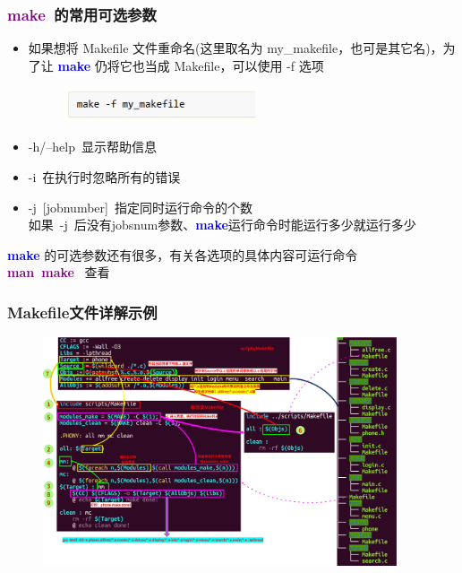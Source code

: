 \frame
{
	\frametitle{\textcolor{purple}{\textbf{make}}~的常用可选参数}
	\begin{itemize}
\item 如果想将 \textrm{Makefile} 文件重命名(这里取名为 \textrm{my\_makefile}，也可是其它名)，为了让 \textcolor{blue}{\textbf{make}} 仍将它也当成 \textrm{Makefile}，可以使用 \textrm{-f} 选项
\begin{figure}[h!]
	\vskip -4pt
\centering
\includegraphics[height=0.4in,clip]{Figures/Make_Makefile_0.png}
\label{Fig:Make_Makefile_0}
\end{figure}
\item \textrm{-h/--help}~显示帮助信息
\item \textrm{-i}~在执行时忽略所有的错误
\item \textrm{-j~[jobnumber]}~指定同时运行命令的个数\\
\vskip 3pt
	如果~\textrm{-j}~后没有\textrm{jobsnum}参数、\textcolor{blue}{\textbf{make}}运行命令时能运行多少就运行多少
	\end{itemize}
\vskip 3pt
\textcolor{blue}{\textbf{make}} 的可选参数还有很多，有关各选项的具体内容可运行命令\\
\textcolor{purple}{\textbf{man~make}}~ 查看
}

\frame
{
	\frametitle{\textrm{Makefile}文件详解示例}
\begin{figure}[h!]
	\vskip -8pt
\centering
\includegraphics[height=2.65in,clip]{Figures/Make_Makefile.jpg}
\label{Fig:Make_Makefile_example}
\end{figure}
}

